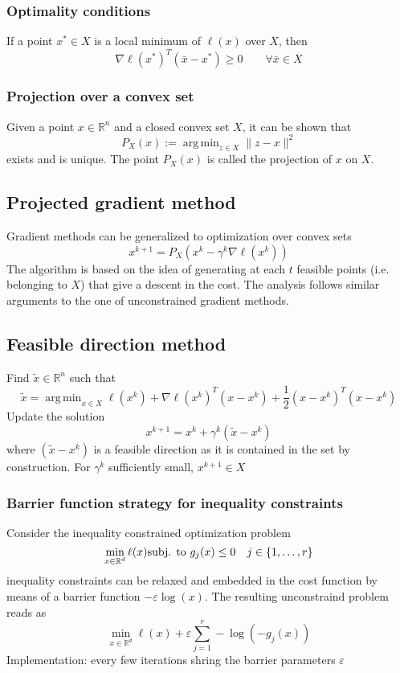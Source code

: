 \documentclass{book}
\DeclareMathOperator*{\argmin}{arg\,min}
\newcommand{\R}{\mathbb{R}}
\theoremstyle{definition}
\theoremstyle{remark}
\theoremstyle{remark}
\begin{document}
\subsubsection{Optimality conditions}
If a point $x^* \in X$ is a local minimum of $\ell(x)$ over $X$, then 
\[
    \nabla\ell(x^*)^T(\bar{x}-x^*)\geq 0 \qquad \forall\bar{x}\in X
\]
\subsubsection{Projection over a convex set}
Given a point $x\in\R^n$ and a closed convex set $X$, it can be shown that 
\[
    P_X(x) := \argmin_{z\in X}\|z-x\|^2
\]
exists and is unique. The point $P_X(x)$ is called the projection of $x$ on $X$.
\subsection{Projected gradient method}
Gradient methods can be generalized to optimization over convex sets 
\[
    x^{k+1}=P_X(x^k-\gamma^k\nabla\ell(x^k))
\]
The algorithm is based on the idea of generating at each $t$ feasible points (i.e. belonging to $X$) that give a descent in the cost. The analysis follows similar arguments to the one of unconstrained gradient methods.

\subsection{Feasible direction method}
Find $\tilde{x}\in\R^n$ such that 
\[
    \tilde{x} = \argmin_{x\in X} \ell(x^k)+\nabla\ell(x^k)^T(x-x^k)+\displaystyle\frac{1}{2}(x-x^k)^T(x-x^k)
\]
Update the solution 
\[
    x^{k+1}=x^k+\gamma^k(\tilde{x}-x^k)
\]
where $(\tilde{x}-x^k)$ is a feasible direction as it is contained in the set by construction. For $\gamma^k$ sufficiently small, $x^{k+1}\in X$

\subsubsection{Barrier function strategy for inequality constraints}
Consider the inequality constrained optimization problem 
\[
    \min_{x\in\R^d}\ell(x)\\
    \text{subj. to } g_j(x)\leq 0 \quad j\in \{1,\dots,r\}
\]  
inequality constraints can be relaxed and embedded in the cost function by means of a barrier function $-\varepsilon \log(x)$. The resulting unconstraind problem reads as 
\[
    \min_{x\in\R^d} \ell(x) + \varepsilon \displaystyle\sum_{j=1}^{r}-\log(-g_j(x))
\]
Implementation: every few iterations shring the barrier parameters $\varepsilon$
\end{document}
